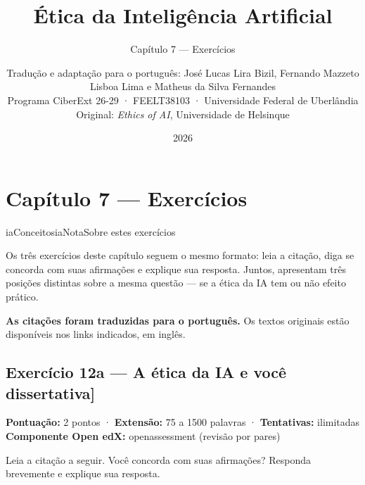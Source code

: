 \documentclass[
  11pt,
]{article}
\title{Ética da Inteligência Artificial}
\subtitle{Capítulo 7 --- Exercícios}
\author{Tradução e adaptação para o português: José Lucas Lira Bizil,
Fernando Mazzeto Lisboa Lima e Matheus da Silva Fernandes\\
Programa CiberExt 26-29 · FEELT38103 · Universidade Federal de
Uberlândia\\
Original: \emph{Ethics of AI}, Universidade de Helsinque}
\date{2026}
\renewcommand{\texttt}[1]{{\color{iaAmeixa}\small\ttfamily #1}}
\newenvironment{nota}[1][Nota]{\begin{iabox}{iaConceitos}{iaNota}{#1}}{\end{iabox}}
\begin{document}
\maketitle

{
\hypersetup{linkcolor=iaConceitos}
\setcounter{tocdepth}{2}
\tableofcontents
}
\hypertarget{capuxedtulo-7-exercuxedcios}{%
\section{Capítulo 7 --- Exercícios}\label{capuxedtulo-7-exercuxedcios}}

\begin{nota}[Sobre estes exercícios]

Os três exercícios deste capítulo seguem o mesmo formato: leia a
citação, diga se concorda com suas afirmações e explique sua resposta.
Juntos, apresentam três posições distintas sobre a mesma questão --- se
a ética da IA tem ou não efeito prático.

\textbf{As citações foram traduzidas para o português.} Os textos
originais estão disponíveis nos links indicados, em inglês.

\end{nota}

\hypertarget{exercuxedcio-12a-a-uxe9tica-da-ia-e-vocuxea-dissertativa}{%
\subsection{\texorpdfstring{Exercício 12a --- A ética da IA e você
\texttt{{[}dissertativa{]}}}{Exercício 12a --- A ética da IA e você {[}dissertativa{]}}}\label{exercuxedcio-12a-a-uxe9tica-da-ia-e-vocuxea-dissertativa}}

\textbf{Pontuação:} 2 pontos · \textbf{Extensão:} 75 a 1500 palavras ·
\textbf{Tentativas:} ilimitadas \textbf{Componente Open edX:}
\texttt{openassessment} (revisão por pares)

Leia a citação a seguir. Você concorda com suas afirmações? Responda
brevemente e explique sua resposta.
\end{document}
